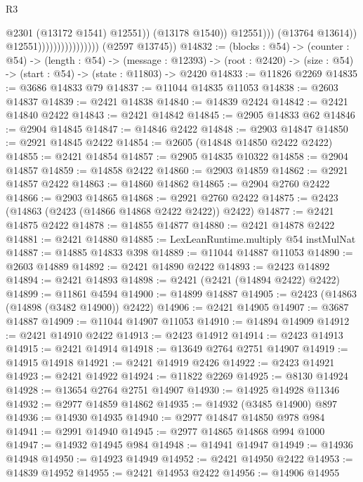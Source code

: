 \begin{lexlean}{R3}
\begin{coremodule}
                                                    @2301
                                                    (@13172 @1541)
                                                    @12551))
                                                (@13178 @1540))
                                              @12551)))
                                        (@13764 @13614))
                                      @12551))))))))))))))))
      (@2597 @13745))
@14832 := (blocks : @54) ->
  (counter : @54) ->
  (length : @54) ->
  (message : @12393) -> (root : @2420) -> (size : @54) -> (start : @54) -> (state : @11803) -> @2420
@14833 := @11826 @2269
@14835 := @3686 @14833 @79
@14837 := @11044 @14835 @11053
@14838 := @2603 @14837
@14839 := @2421 @14838
@14840 := @14839 @2424
@14842 := @2421 @14840 @2422
@14843 := @2421 @14842
@14845 := @2905 @14833 @62
@14846 := @2904 @14845
@14847 := @14846 @2422
@14848 := @2903 @14847
@14850 := @2921 @14845 @2422
@14854 := @2605 (@14848 @14850 @2422 @2422)
@14855 := @2421 @14854
@14857 := @2905 @14835 @10322
@14858 := @2904 @14857
@14859 := @14858 @2422
@14860 := @2903 @14859
@14862 := @2921 @14857 @2422
@14863 := @14860 @14862
@14865 := @2904 @2760 @2422
@14866 := @2903 @14865
@14868 := @2921 @2760 @2422
@14875 := @2423 (@14863 (@2423 (@14866 @14868 @2422 @2422)) @2422)
@14877 := @2421 @14875 @2422
@14878 := @14855 @14877
@14880 := @2421 @14878 @2422
@14881 := @2421 @14880
@14885 := LexLeanRuntime.multiply @54 instMulNat
@14887 := @14885 @14833 @398
@14889 := @11044 @14887 @11053
@14890 := @2603 @14889
@14892 := @2421 @14890 @2422
@14893 := @2423 @14892
@14894 := @2421 @14893
@14898 := @2421 (@2421 (@14894 @2422) @2422)
@14899 := @11861 @4594
@14900 := @14899 @14887
@14905 := @2423 (@14863 (@14898 (@3482 @14900)) @2422)
@14906 := @2421 @14905
@14907 := @3687 @14887
@14909 := @11044 @14907 @11053
@14910 := @14894 @14909
@14912 := @2421 @14910 @2422
@14913 := @2423 @14912
@14914 := @2423 @14913
@14915 := @2421 @14914
@14918 := @13649 @2764 @2751 @14907
@14919 := @14915 @14918
@14921 := @2421 @14919 @2426
@14922 := @2423 @14921
@14923 := @2421 @14922
@14924 := @11822 @2269
@14925 := @8130 @14924
@14928 := @13654 @2764 @2751 @14907
@14930 := @14925 @14928 @11346
@14932 := @2977 @14859 @14862
@14935 := @14932 (@3485 @14900) @897
@14936 := @14930 @14935
@14940 := @2977 @14847 @14850 @978 @984
@14941 := @2991 @14940
@14945 := @2977 @14865 @14868 @994 @1000
@14947 := @14932 @14945 @984
@14948 := @14941 @14947
@14949 := @14936 @14948
@14950 := @14923 @14949
@14952 := @2421 @14950 @2422
@14953 := @14839 @14952
@14955 := @2421 @14953 @2422
@14956 := @14906 @14955

\end{coremodule}
\end{lexlean}
